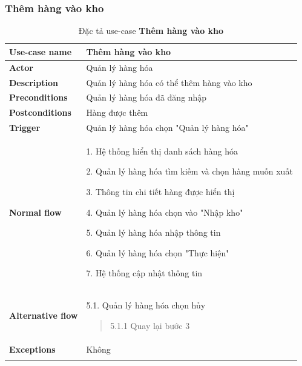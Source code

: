 \subsubsection{Thêm hàng vào kho}
{
    \setlength\extrarowheight{6pt}
    \begin{longtable}{| p{} | p{} |}
        \hline
        \textbf{Use-case name}
         &
        Thêm hàng vào kho
        \\
        \hline
        \textbf{Actor}
         &
        Quản lý hàng hóa
        \\
        \hline
        \textbf{Description}
         &
        Quản lý hàng hóa có thể thêm hàng vào kho
        \\
        \hline
        \textbf{Preconditions}
         &
        Quản lý hàng hóa đã đăng nhập
        \\
        \hline
        \textbf{Postconditions}
         &
        Hàng được thêm
        \\
        \hline
        \textbf{Trigger}
         &
        Quản lý hàng hóa chọn "Quản lý hàng hóa"
        \\
        \hline
        \begin{flushleft}
            \textbf{Normal flow}
        \end{flushleft}
         &
        1. Hệ thống hiển thị danh sách hàng hóa

        2. Quản lý hàng hóa tìm kiếm và chọn hàng muốn xuất

        3. Thông tin chi tiết hàng được hiển thị

        4. Quản lý hàng hóa chọn vào "Nhập kho"

        5. Quản lý hàng hóa nhập thông tin

        6. Quản lý hàng hóa chọn "Thực hiện"

        7. Hệ thống cập nhật thông tin
        \\
        \hline
        \begin{flushleft}
            \textbf{Alternative flow}
        \end{flushleft}
         &
        5.1. Quản lý hàng hóa chọn hủy
        \begin{quote}
            5.1.1 Quay lại bước 3
        \end{quote}
        \\
        \hline
        \textbf{Exceptions}
         &
        Không
        \\
        \hline
        \caption{Đặc tả use-case \textbf{Thêm hàng vào kho}}
    \end{longtable}
}


